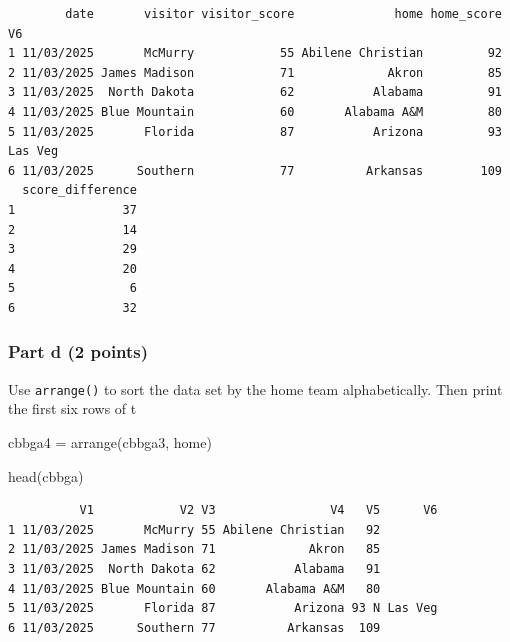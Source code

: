 \documentclass[
  letterpaper,
  DIV=11,
  numbers=noendperiod]{scrartcl}
\newenvironment{Shaded}{\begin{snugshade}}{\end{snugshade}}
\newcommand{\AttributeTok}[1]{\textcolor[rgb]{0.40,0.45,0.13}{#1}}
\newcommand{\FunctionTok}[1]{\textcolor[rgb]{0.28,0.35,0.67}{#1}}
\newcommand{\NormalTok}[1]{\textcolor[rgb]{0.00,0.23,0.31}{#1}}
\newcommand{\OtherTok}[1]{\textcolor[rgb]{0.00,0.23,0.31}{#1}}
\newcommand{\SpecialCharTok}[1]{\textcolor[rgb]{0.37,0.37,0.37}{#1}}
\newcommand{\StringTok}[1]{\textcolor[rgb]{0.13,0.47,0.30}{#1}}
\begin{document}
\begin{Shaded}
\end{Shaded}

\begin{verbatim}
        date       visitor visitor_score              home home_score      V6
1 11/03/2025       McMurry            55 Abilene Christian         92        
2 11/03/2025 James Madison            71             Akron         85        
3 11/03/2025  North Dakota            62           Alabama         91        
4 11/03/2025 Blue Mountain            60       Alabama A&M         80        
5 11/03/2025       Florida            87           Arizona         93 Las Veg
6 11/03/2025      Southern            77          Arkansas        109        
  score_difference
1               37
2               14
3               29
4               20
5                6
6               32
\end{verbatim}

\subsubsection{Part d (2 points)}\label{part-d-2-points}

Use \texttt{arrange()} to sort the data set by the home team
alphabetically. Then print the first six rows of t

\begin{Shaded}
\begin{Highlighting}[]
\NormalTok{cbbga4 }\OtherTok{=} \FunctionTok{arrange}\NormalTok{(cbbga3, home)}

\FunctionTok{head}\NormalTok{(cbbga)}
\end{Highlighting}
\end{Shaded}

\begin{verbatim}
          V1            V2 V3                V4   V5      V6
1 11/03/2025       McMurry 55 Abilene Christian   92        
2 11/03/2025 James Madison 71             Akron   85        
3 11/03/2025  North Dakota 62           Alabama   91        
4 11/03/2025 Blue Mountain 60       Alabama A&M   80        
5 11/03/2025       Florida 87           Arizona 93 N Las Veg
6 11/03/2025      Southern 77          Arkansas  109        
\end{verbatim}
\end{document}

